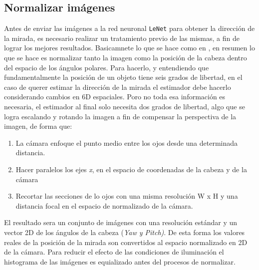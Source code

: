 \documentclass[12pt]{book} %
\begin{document}
	\subsection{Normalizar imágenes}
		Antes de enviar las imágenes a la red neuronal \texttt{LeNet} para obtener la dirección de la mirada, es necesario realizar un 
		tratamiento previo de las mismas, a fin de lograr los mejores resultados.
		Basicamnete lo que se hace como en \cite{Sugano}, en resumen lo que se hace es normalizar tanto la imagen como la posición de 
		la cabeza dentro del espacio de los ángulos polares. 
		Para hacerlo, y entendiendo que fundamentalmente la posición de un objeto tiene seis grados de libertad, en el caso de querer 
		estimar la dirección de la mirada el estimador debe hacerlo considerando cambios en 6D espaciales.
		Poro no toda esa información es necesaria, el estimador al final solo necesita dos grados de libertad, algo que se logra escalando 
		y rotando la imagen a fin de compensar la perspectiva de la imagen, de forma que:
		\begin{enumerate}
			\item La cámara enfoque el punto medio entre los ojos desde una determinada distancia.
			\item Hacer paralelos los ejes \textit{x}, en el espacio de coordenadas de la cabeza y de la cámara 
			\item Recortar las secciones de lo ojos con una misma resolución \textsf{W x H} y una distancia focal en el espacio de normalizado
				de la cámara.
		\end{enumerate}
		El resultado sera un conjunto de imágenes con una resolución estándar y un vector 2D de los ángulos de la cabeza (\textit{Yaw y Pitch)}.
		De esta forma los valores reales de la posición de la mirada son convertidos al espacio normalizado en 2D de la cámara.
		Para reducir el efecto de las condiciones de iluminación el histograma de las imágenes es equializado antes del procesos de normalizar.
\end{document}
